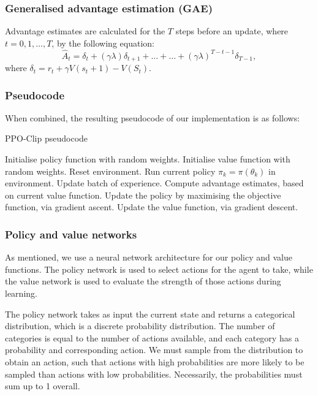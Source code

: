 \documentclass[12pt,a4paper]{article}
\begin{document}
\subsubsection{Generalised advantage estimation (GAE)}
Advantage estimates are calculated for the $T$ steps before an update, where $t = 0, 1, \dots, T$, by the following equation: $$\hat{A}_t = \delta_t + (\gamma\lambda)\delta_{t+1} + \dots + \dots + (\gamma\lambda)^{T-t-1}\delta_{T-1},$$ where $\delta_t = r_t + \gamma V(s_t+1) - V(S_t)$.

\subsubsection{Pseudocode}
When combined, the resulting pseudocode of our implementation is as follows:

\begin{algorithm}[h]
    \caption{PPO-Clip pseudocode}
    \label{alg1}
\begin{algorithmic}[1]
    \STATE Initialise policy function with random weights.
    \STATE Initialise value function with random weights.
    \STATE Reset environment.
    \STATE Run current policy $\pi_k = \pi(\theta_k)$ in environment.
    \STATE Update batch of experience.
    \ENDFOR
    \STATE Compute advantage estimates, based on current value function.
    \STATE Update the policy by maximising the objective function, via gradient ascent.
    \STATE Update the value function, via gradient descent. 
    \ENDWHILE
    \ENDFOR
\end{algorithmic}
\end{algorithm}

\subsubsection{Policy and value networks}
As mentioned, we use a neural network architecture for our policy and value functions. The policy network is used to select actions for the agent to take, while the value network is used to evaluate the strength of those actions during learning. 

The policy network takes as input the current state and returns a categorical distribution, which is a discrete probability distribution. The number of categories is equal to the number of actions available, and each category has a probability and corresponding action. We must sample from the distribution to obtain an action, such that actions with high probabilities are more likely to be sampled than actions with low probabilities. Necessarily, the probabilities must sum up to 1 overall. 
\end{document}
